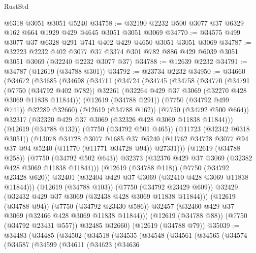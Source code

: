 \begin{lexlean}{RustStd}
\begin{coremodule}
    @6318
    @3051
    @3051
    @5240
@34758 := @32190 @2232 @500 @3077 @37 @6329 @162 @664 @1929 @429 @4645 @3051 @3051 @3069
@34770 := @34575 @499 @3077 @37 @6328 @291 @741 @402 @429 @4650 @3051 @3051 @3069
@34787 := @32223
    @2232
    @402
    @3077
    @37
    @3374
    @301
    @782
    @886
    @429
    @6039
    @3051
    @3051
    @3069
    (@32240 @2232 @3077 @37)
@34788 := @12639 @2232
@34791 := @34787 (@12619 (@34788 @301))
@34792 := @23734 @2232
@34950 := @34660
    (@34672
      (@34685
        (@34698
          (@34711
            (@34724
              (@34745
                (@34758
                  (@34770
                    (@34791
                      (@7750 (@34792 @402 @782))
                      @32261
                      (@32264 @429 @37 @3069 (@32270 @428 @3069 @11838 @11844)))
                    (@12619 (@34788 @291))
                    (@7750 (@34792 @499 @741))
                    @32289
                    @32660)
                  (@12619 (@34788 @162))
                  (@7750 (@34792 @500 @664))
                  @32317
                  (@32320 @429 @37 @3069 (@32326 @428 @3069 @11838 @11844)))
                (@12619 (@34788 @132))
                (@7750 (@34792 @501 @465))
                (@11723 (@32342 @6318 @3051))
                (@13078
                  @34728
                  @3077
                  @1685
                  @37
                  @5240
                  (@11762 @34728 @3077 @94 @37 @94 @5240 (@11770 (@11771 @34728 @94)) @27331)))
              (@12619 (@34788 @258))
              (@7750 (@34792 @502 @643))
              @32373
              (@32376 @429 @37 @3069 (@32382 @428 @3069 @11838 @11844)))
            (@12619 (@34788 @118))
            (@7750 (@34792 @23428 @620))
            @32401
            (@32404 @429 @37 @3069 (@32410 @428 @3069 @11838 @11844)))
          (@12619 (@34788 @103))
          (@7750 (@34792 @23429 @609))
          @32429
          (@32432 @429 @37 @3069 (@32438 @428 @3069 @11838 @11844)))
        (@12619 (@34788 @94))
        (@7750 (@34792 @23430 @586))
        @32457
        (@32460 @429 @37 @3069 (@32466 @428 @3069 @11838 @11844)))
      (@12619 (@34788 @88))
      (@7750 (@34792 @23431 @557))
      @32485
      @32660)
    (@12619 (@34788 @79))
@35039 := @34483
    (@34485
      (@34502
        (@34518
          (@34535
            (@34548
              (@34561
                (@34565
                  (@34574
                    (@34587
                      (@34599
                        (@34611
                          (@34623
                            (@34636

\end{coremodule}
\end{lexlean}
